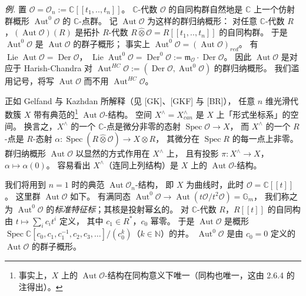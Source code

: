 \emph{例.} 置 $\mathcal{O}=\mathcal{O}_n:=\mathbb{C}[[t_1,..,t_n]]$。
$\mathbb{C}$-代数 $\mathcal{O}$ 的自同构群自然地是 $\mathbb{C}$ 上一个仿射群概形
$\operatorname{Aut}^0\mathcal{O}$ 的 $\mathbb{C}$-点群。
记 $\operatorname{Aut}\mathcal{O}$ 为这样的群归纳概形：
对任意 $\mathbb{C}$-代数 $R$，$(\operatorname{Aut}\mathcal{O})(R)$ 是拓扑 $R$-代数
$R\hat{\otimes}\mathcal{O}=R[[t_1,..,t_n]]$ 的自同构群。
于是 $\operatorname{Aut}^0\mathcal{O}$ 是 $\operatorname{Aut}\mathcal{O}$ 的群子概形；
事实上 $\operatorname{Aut}^0\mathcal{O}=(\operatorname{Aut}\mathcal{O})_{red}$。
有 $\operatorname{Lie}\operatorname{Aut}\mathcal{O}=\operatorname{Der}\mathcal{O}$，
$\operatorname{Lie}\operatorname{Aut}^0\mathcal{O}=\operatorname{Der}^0\mathcal{O}
:=\mathfrak{m}_{\mathcal{O}}\cdot\operatorname{Der}\mathcal{O}$。
因此 $\operatorname{Aut}\mathcal{O}$ 是对应于 Harish-Chandra 对
$\operatorname{Aut}^{HC}\mathcal{O}:=(\operatorname{Der}\mathcal{O},\operatorname{Aut}^0\mathcal{O})$ 的群归纳概形。
我们滥用记号，将写 $\operatorname{Aut}\mathcal{O}$ 而不用 $\operatorname{Aut}^{HC}\mathcal{O}$。

正如 Gelfand 与 Kazhdan 所解释（见 [GK]、[GKF] 与 [BR]），
任意 $n$ 维光滑代数簇 $X$ 带有典范的\footnote{事实上，$X$ 上的 $\operatorname{Aut}\mathcal{O}$-结构在同构意义下唯一（同构也唯一，这由 2.6.4 的注得出）。}
$\operatorname{Aut}\mathcal{O}$-结构。
空间 $X^{\wedge}=X^{\wedge}_{can}$ 是 $X$ 上「形式坐标系」的空间。
换言之，$X^{\wedge}$ 的一个 $\mathbb{C}$-点是微分非零的态射 $\operatorname{Spec}\mathcal{O}\to X$，
而 $X^{\wedge}$ 的一个 $R$-点是 $R$-态射
$\alpha: \operatorname{Spec}(R\hat{\otimes}\mathcal{O})\to X\otimes R$，
其微分在 $\operatorname{Spec} R$ 的每一点上非零。
群归纳概形 $\operatorname{Aut}\mathcal{O}$ 以显然的方式作用在 $X^{\wedge}$ 上，
且有投影 $\pi: X^{\wedge}\to X$，$\alpha\mapsto\alpha(0)$。
容易看出 $X^{\wedge}$（连同上列结构）是 $X$ 上的 $\operatorname{Aut}\mathcal{O}$-结构。

我们将用到 $n=1$ 时的典范 $\operatorname{Aut}\mathcal{O}_n$-结构，
即 $X$ 为曲线时，此时 $\mathcal{O}=\mathbb{C}[[t]]$。
这里群 $\operatorname{Aut}\mathcal{O}$ 如下。
有满同态
$\operatorname{Aut}^0\mathcal{O}\to\operatorname{Aut}(t\mathcal{O}/t^2\mathcal{O})=\mathbb{G}_m$，
我们称之为 $\operatorname{Aut}^0\mathcal{O}$ 的\emph{标准特征标}；其核是投射幂幺的。
对 $\mathbb{C}$-代数 $R$，$R[[t]]$ 的自同构由 $t\mapsto\sum_i c_i t^i$ 定义，
其中 $c_1\in R^*$，$c_0$ 幂零。
于是 $\operatorname{Aut}\mathcal{O}$ 是概形
$\operatorname{Spec}\mathbb{C}[c_0,c_1,c_1^{-1},c_2,c_3,\dots]/(c_0^k)$（$k\in\mathbb{N}$）的并。
$\operatorname{Aut}^0\mathcal{O}$ 是由 $c_0=0$ 定义的 $\operatorname{Aut}\mathcal{O}$ 的群子概形。

